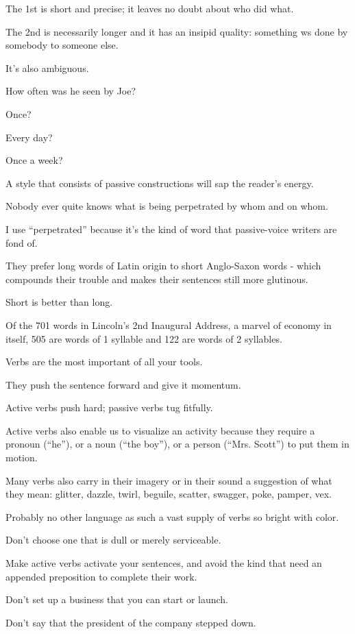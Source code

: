 \documentclass{book}
\numberwithin{equation}{section}
\begin{document}
The 1st is short and precise; it leaves no doubt about who did what.

The 2nd is necessarily longer and it has an insipid quality: something ws done by somebody to someone else.

It's also ambiguous.

How often was he seen by Joe? 

Once?

Every day?

Once a week?

A style that consists of passive constructions will sap the reader's energy.

Nobody ever quite knows what is being perpetrated by whom and on whom.

I use ``perpetrated'' because it's the kind of word that passive-voice writers are fond of.

They prefer long words of Latin origin to short Anglo-Saxon words - which compounds their trouble and makes their sentences still more glutinous.

Short is better than long.

Of the 701 words in Lincoln's 2nd Inaugural Address, a marvel of economy in itself, 505 are words of 1 syllable and 122 are words of 2 syllables.

%
Verbs are the most important of all your tools.

They push the sentence forward and give it momentum.

Active verbs push hard; passive verbs tug fitfully.

Active verbs also enable us to visualize an activity because they require a pronoun (``he''), or a noun (``the boy''), or a person (``Mrs. Scott'') to put them in motion.

Many verbs also carry in their imagery or in their sound a suggestion of what they mean: glitter, dazzle, twirl, beguile, scatter, swagger, poke, pamper, vex.

Probably no other language as such a vast supply of verbs so bright with color.

Don't choose one that is dull or merely serviceable.

Make active verbs activate your sentences, and avoid the kind that need an appended preposition to complete their work.

Don't set up a business that you can start or launch.

Don't say that the president of the company stepped down.
\end{document}
